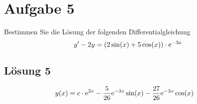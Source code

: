 \documentclass[main.tex]{subfiles}
\begin{document}
\section{Aufgabe 5}
Bestimmen Sie die Lösung der folgenden Differentialgleichung
\[
    y' - 2y = (2\sin(x) + 5\cos(x)) \cdot \mathrm{e}^{-3x}
\]

\subsection{Lösung 5}
\begin{align*}
    y(x) &= c \cdot \mathrm{e}^{2x} - \frac{5}{26} \mathrm{e}^{-3 x} \sin(x) - \frac{27}{26} \mathrm{e}^{-3x} \cos(x)
\end{align*}
\end{document}
